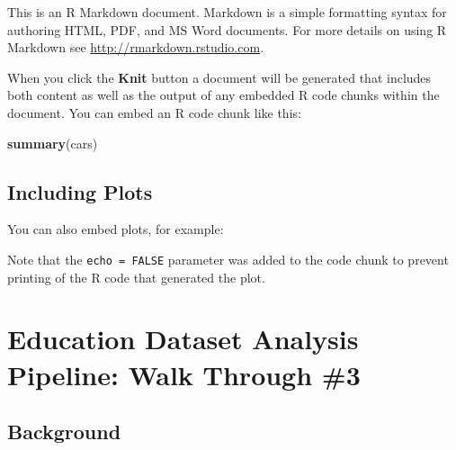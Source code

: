 \documentclass[]{book}
\newenvironment{Shaded}{\begin{snugshade}}{\end{snugshade}}
\newcommand{\KeywordTok}[1]{\textcolor[rgb]{0.13,0.29,0.53}{\textbf{#1}}}
\newcommand{\DataTypeTok}[1]{\textcolor[rgb]{0.13,0.29,0.53}{#1}}
\newcommand{\DecValTok}[1]{\textcolor[rgb]{0.00,0.00,0.81}{#1}}
\newcommand{\StringTok}[1]{\textcolor[rgb]{0.31,0.60,0.02}{#1}}
\newcommand{\CommentTok}[1]{\textcolor[rgb]{0.56,0.35,0.01}{\textit{#1}}}
\newcommand{\OtherTok}[1]{\textcolor[rgb]{0.56,0.35,0.01}{#1}}
\newcommand{\OperatorTok}[1]{\textcolor[rgb]{0.81,0.36,0.00}{\textbf{#1}}}
\newcommand{\NormalTok}[1]{#1}
\begin{document}
This is an R Markdown document. Markdown is a simple formatting syntax
for authoring HTML, PDF, and MS Word documents. For more details on
using R Markdown see \url{http://rmarkdown.rstudio.com}.

When you click the \textbf{Knit} button a document will be generated
that includes both content as well as the output of any embedded R code
chunks within the document. You can embed an R code chunk like this:

\begin{Shaded}
\begin{Highlighting}[]
\KeywordTok{summary}\NormalTok{(cars)}
\end{Highlighting}
\end{Shaded}

\section{Including Plots}\label{including-plots}

You can also embed plots, for example:

Note that the \texttt{echo\ =\ FALSE} parameter was added to the code
chunk to prevent printing of the R code that generated the plot.

\chapter{Education Dataset Analysis Pipeline: Walk Through
\#3}\label{education-dataset-analysis-pipeline-walk-through-3}

\begin{Shaded}
\end{Shaded}

\section{Background}\label{background}
\end{document}
